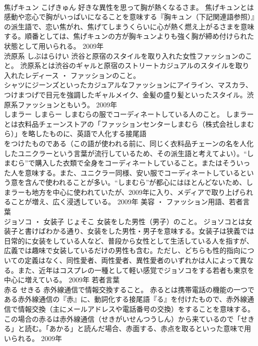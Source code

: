 \documentclass[8pt]{extreport}
\begin{document}
\begin{CJK}{UTF8}{min}
\\	焦げキュン	こげきゅん	好きな異性を思って胸が熱くなるさま。	焦げキュンとは感動や恋心で胸がいっぱいになることを意味する『胸キュン（下記関連語参照）』の派生語で、恋い焦がれ、焦げてしまうくらいに心が熱く燃え上がるさまを意味する。順番としては、焦げキュンの方が胸キュンよりも強く胸が締め付けられた状態として用いられる。	2009年	
\\	渋原系	しぶはらけい	渋谷と原宿のスタイルを取り入れた女性ファッションのこと。	渋原系とは渋谷のギャルと原宿のストリートカジュアルのスタイルを取り入れたレディース ・ ファッションのこと。
\\	シャツにジーンズといったカジュアルなファッションにアイライン、マスカラ、つけまつげで目元を強調したギャルメイク、金髪の盛り髪といったスタイル。渋原系ファッションともいう。	2009年	
\\	しまラー	しまらー	しまむらの服でコーディネートしている人のこと。	しまラーとは衣料品チェーンストアの「ファッションセンターしまむら（株式会社しまむら）」を略したものに、英語で人化する接尾語
\\	をつけたものである（この語が使われる前に、同じく衣料品チェーンの名を人化したユニクラーという言葉が流行しているため、その派生語と考えてよい）。“しまむら”で購入した衣類で全身をコーディネートしていること。またはそういった人を意味する。また、ユニクラー同様、安い服でコーディネートしているという意を含んで使われることが多い。“しまむら”が都心にはほとんどないため、しまラーも地方を中心に使われていたが、2009年に入り、メディアで取り上げられることが増え、広く浸透している。	2009年	美容 ・ ファッション用語、若者言葉	
\\	ジョソコ ・ 女装子	じょそこ	女装をした男性（男子）のこと。	ジョソコとは女装子と書けばわかる通り、女装をした男性・男子を意味する。女装子は狭義では日常的に女装をしている人など、普段から女性として生活している人を指すが、広義では趣味で女装しているだけの男性も含む。ただし、どちらも性的指向についての定義はなく、同性愛者、両性愛者、異性愛者のいずれかは人によって異なる。また、近年はコスプレの一種として軽い感覚でジョソコをする若者も東京を中心に増えている。	2009年	若者言葉	
\\	赤る	せきる	赤外線通信で情報交換すること。	赤るとは携帯電話の機能の一つである赤外線通信の『赤』に、動詞化する接尾語『る』を付けたもので、赤外線通信で情報交換（主にメールアドレスや電話番号の交換）をすることを意味する。この場合の赤るは赤外線通信（せきがいせんつうしん）から来ているので「せきる」と読む。「あかる」と読んだ場合、赤面する、赤点を取るといった意味で用いられる。	2009年	

\end{CJK}
\end{document}
